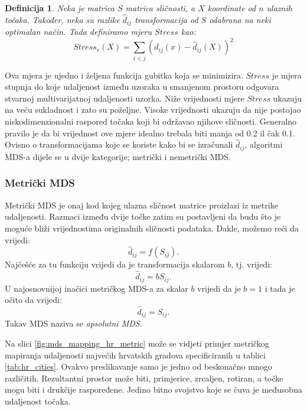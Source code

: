 \documentclass[times, utf8, diplomski]{fer}
\newtheorem{definition}{Definicija}         %
\begin{document}
\begin{definition}
    Neka je matrica $S$ matrica sličnosti, a $X$ koordinate od $n$ ulaznih točaka. Također, neka su razlike $\hat{d}_{ij}$ transformacija od $S$ odabrana na neki optimalan način. Tada definiramo mjeru $Stress$ kao:
    \begin{equation}
        Stress_r(X) = \sum_{i < j} (d_{ij}(x) - \hat{d}_{ij}(X))^2
    \end{equation}
\end{definition}
Ova mjera je ujedno i željena funkcija gubitka koja se minimizira. $Stress$ je mjera stupnja do koje udaljenost između uzoraka u smanjenom prostoru odgovara stvarnoj multivarijatnoj udaljenosti uzorka. Niže vrijednosti mjere $Stress$ ukazuju na veću sukladnost i zato su poželjne. Visoke vrijednosti ukazuju da nije postojao niskodimenzionalni raspored točaka koji bi održavao njihove sličnosti. Generalno pravilo je da bi vrijednost ove mjere idealno trebala biti manja od 0.2 il čak 0.1.
Ovisno o transformacijama koje se koriste kako bi se izračunali $\hat{d}_{ij}$, algoritmi MDS-a dijele se u dvije kategorije; metrički i nemetrički MDS.

\subsubsection{Metrički MDS}
Metrički MDS  je onaj kod kojeg ulazna sličnost matrice proizlazi iz metrike udaljenosti. Razmaci između dvije točke zatim su postavljeni da budu što je moguće bliži vrijednostima originalnih sličnosti podataka.
Dakle, možemo reći da vrijedi:
\begin{equation}
    \hat{d}_{ij} = f(S_{ij}).
\end{equation}
Najčešće za tu funkciju vrijedi da je transformacija skalarom $b$, tj. vrijedi:
\begin{equation}
    \hat{d}_{ij} = bS_{ij}.
\end{equation}
U najosnovnijoj inačici metričkog MDS-a za skalar $b$ vrijedi da je $b = 1$ i tada je očito da vrijedi:
\begin{equation}
    \hat{d}_{ij} = S_{ij}.
\end{equation}
Takav MDS naziva se \emph{apsolutni MDS}.

Na slici \ref{fig:mds_mapping_hr_metric} može se vidjeti primjer metričkog mapiranja udaljenosti najvećih hrvatskih gradova specificiranih u tablici \ref{tab:hr_cities}. Ovakvo preslikavanje samo je jedno od beskonačno mnogo različitih. Rezultantni prostor može biti, primjerice, zrcaljen, rotiran, a točke mogu biti i drukčije raspoređene. Jedino bitno svojstvo koje se čuva je međusobna udaljenost točaka.
\end{document}
